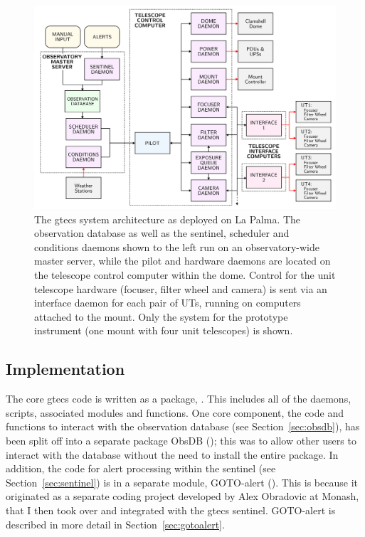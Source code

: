 \begin{colsection}
\begin{colsection}
\begin{figure}[p]
\begin{center}
\includegraphics[width=\linewidth]{images/flow.pdf}
\end{center}
\caption[The G-TeCS system architecture]{The \gls{gtecs} system architecture as deployed on La Palma. The observation database as well as the sentinel, scheduler and conditions daemons shown to the left run on an observatory-wide master server, while the pilot and hardware daemons are located on the telescope control computer within the dome. Control for the unit telescope hardware (focuser, filter wheel and camera) is sent via an interface daemon for each pair of UTs, running on computers attached to the mount. Only the system for the prototype instrument (one mount with four unit telescopes) is shown.}
\label{fig:flow}
\end{figure}

\end{colsection}


\subsection{Implementation}
\label{sec:implementation}
\begin{colsection}

The core \gls{gtecs} code is written as a  package, . This includes all of the daemons, scripts, associated modules and functions. One core component, the code and functions to interact with the observation database (see Section~\ref{sec:obsdb}), has been split off into a separate  package ObsDB (); this was to allow other users to interact with the database without the need to install the entire  package. In addition, the code for alert processing within the sentinel (see Section~\ref{sec:sentinel}) is in a separate module, GOTO-alert (). This is because it originated as a separate coding project developed by Alex Obradovic at Monash, that I then took over and integrated with the \gls{gtecs} sentinel. GOTO-alert is described in more detail in Section~\ref{sec:gotoalert}.


\end{colsection}
\end{colsection}
